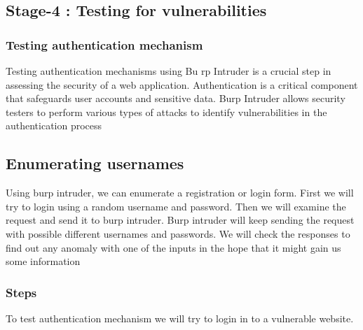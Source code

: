 \documentclass[
	a4paper, %
	12pt, %
]{CSSullivanBusinessReport}
\begin{document}
\subsection*{Stage-4 : Testing for vulnerabilities}
\begin{fullwidth}

\subsubsection*{Testing authentication mechanism}

\begin{fullwidth}Testing authentication mechanisms using Bu rp Intruder is a crucial step in assessing the security of a web application. Authentication is a critical component that safeguards user accounts and sensitive data. Burp Intruder allows security testers to perform various types of attacks to identify vulnerabilities in the authentication process\end{fullwidth}



\subsection*{Enumerating usernames}

\begin{fullwidth}Using burp intruder, we can enumerate a registration or login form. First we will try to login using a random username and password. Then we will examine the request and send it to burp intruder. Burp intruder will keep sending the request with possible different usernames and passwords. We will check the responses to find out any anomaly with one of the inputs in the hope that it might gain us some information \end{fullwidth}


\subsubsection*{Steps}

To test authentication mechanism we will try to login in to a vulnerable website.


\end{fullwidth}
\end{document}
